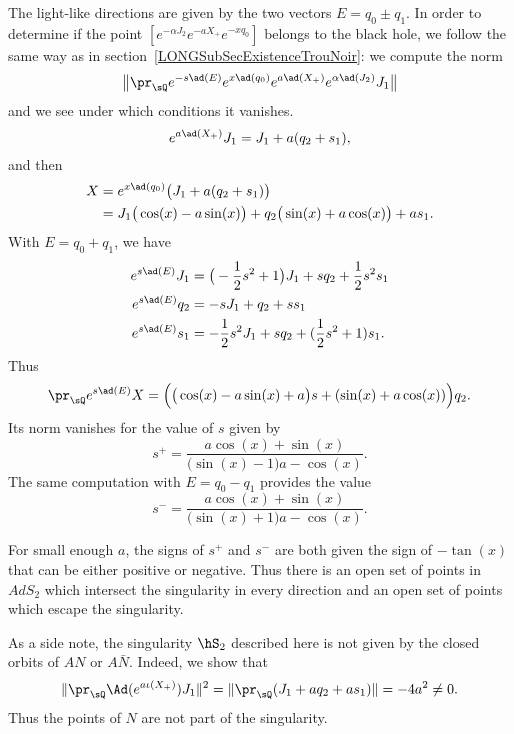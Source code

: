 The light-like directions are given by the two vectors $E=q_0\pm q_1$. In order to determine if the point $[e^{-\alpha J_2}e^{-aX_+} e^{-xq_0}]$ belongs to the black hole, we follow the same way as in section~\ref{LONGSubSecExistenceTrouNoir}: we compute the norm
\begin{equation}
    \big\| \pr_{\sQ}  e^{-s\ad(E)}e^{x\ad(q_0)} e^{a\ad(X_+)} e^{\alpha\ad(J_2)}J_1 \big\|
\end{equation}
and we see under which conditions it vanishes.
%
\begin{equation}
    e^{a\ad(X_+)}J_1=J_1+a(q_2+s_1),
\end{equation}
and then
\begin{equation}
    \begin{aligned}[]
        X&= e^{x\ad(q_0)}\big( J_1+a(q_2+s_1) \big)\\
        &=J_1\big( \cos(x)-a\sin(x) \big)+q_2\big( \sin(x)+a\cos(x) \big)+as_1.
    \end{aligned}
\end{equation}
With $E=q_0+q_1$, we have
\begin{equation}
    \begin{aligned}[]
        e^{s\ad(E)}J_1&=\big( -\frac{ 1 }{2}s^2+1 \big)J_1+sq_2+\frac{ 1 }{2}s^2s_1\\
        e^{s\ad(E)}q_2&=-sJ_1+q_2+ss_1\\
        e^{s\ad(E)}s_1&=-\frac{ 1 }{2}s^2J_1+sq_2+(\frac{ 1 }{2}s^2+1)s_1.
    \end{aligned}
\end{equation}
Thus
\begin{equation}
    \pr_{\sQ} e^{s\ad(E)}X=\Big( \big( \cos(x)-a\sin(x)+a \big)s+(\sin(x)+a\cos(x)) \Big)q_2.
\end{equation}
Its norm vanishes for the value of $s$ given by
\begin{equation}
    s^+=\frac{ a\cos(x)+\sin(x) }{ \big( \sin(x)-1 \big)a-\cos(x) }.
\end{equation}
The same computation with $E=q_0-q_1$ provides the value
\begin{equation}
    s^-=\frac{ a\cos(x)+\sin(x) }{ \big( \sin(x)+1 \big)a-\cos(x) }.
\end{equation}

For small enough $a$, the signs of $s^+$ and $s^-$ are both given the sign of $-\tan(x)$ that can be either positive or negative. Thus there is an open set of points in $AdS_2$ which intersect the singularity in every direction and an open set of points which escape the singularity.

As a side note, the singularity $\hS_2$ described here is not given by the closed orbits of $AN$ or $A\bar N$. Indeed, we show that
\begin{equation}
    \| \pr_{\sQ}\Ad( e^{a\iota(X_+)})J_1 \|^2=\| \pr_{\sQ}(J_1+aq_2+as_1) \|=-4a^2\neq 0.
\end{equation}
Thus the points of $N$ are not part of the singularity.

